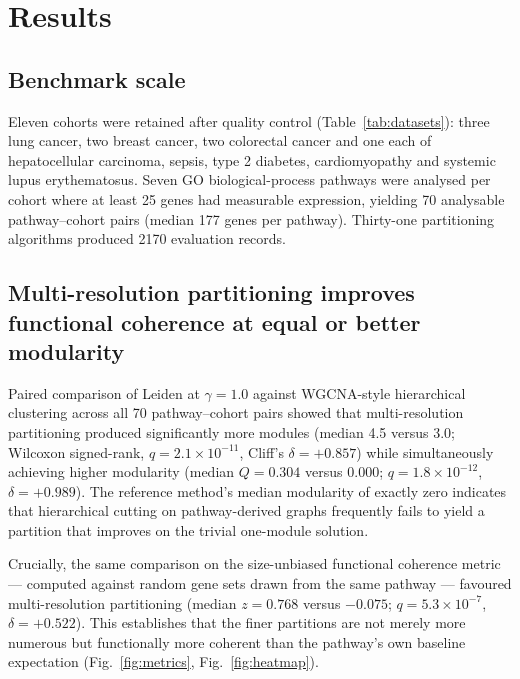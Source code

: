 \documentclass[twocolumn,11pt]{article}
\begin{document}
\section{Results}

\subsection{Benchmark scale}

Eleven cohorts were retained after quality control (Table~\ref{tab:datasets}): three lung
cancer, two breast cancer, two colorectal cancer and one each of hepatocellular carcinoma,
sepsis, type 2 diabetes, cardiomyopathy and systemic lupus erythematosus. Seven GO
biological-process pathways were analysed per cohort where at least 25 genes had measurable
expression, yielding 70 analysable pathway--cohort pairs (median 177 genes per pathway).
Thirty-one partitioning algorithms produced 2170 evaluation records.

\subsection{Multi-resolution partitioning improves functional coherence at equal or better
modularity}
\label{sec:main}

Paired comparison of Leiden at $\gamma=1.0$ against WGCNA-style hierarchical clustering
across all 70 pathway--cohort pairs showed that multi-resolution partitioning produced
significantly more modules (median 4.5 versus 3.0; Wilcoxon signed-rank,
$q = 2.1\times10^{-11}$, Cliff's $\delta = +0.857$) while simultaneously achieving higher
modularity (median $Q = 0.304$ versus $\mathbf{0.000}$; $q = 1.8\times10^{-12}$,
$\delta = +0.989$). The reference method's median modularity of exactly zero indicates that
hierarchical cutting on pathway-derived graphs frequently fails to yield a partition that
improves on the trivial one-module solution.

Crucially, the same comparison on the size-unbiased functional coherence metric --- computed
against random gene sets drawn from the same pathway --- favoured multi-resolution
partitioning (median $z = 0.768$ versus $-0.075$; $q = 5.3\times10^{-7}$,
$\delta = +0.522$). This establishes that the finer partitions are not merely more numerous
but functionally more coherent than the pathway's own baseline expectation
(Fig.~\ref{fig:metrics}, Fig.~\ref{fig:heatmap}).
\end{document}
